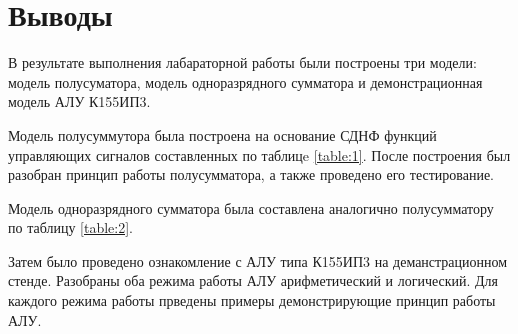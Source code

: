 \section*{Выводы}

В результате выполнения лабараторной работы были построены 
три модели: модель полусуматора, модель одноразрядного сумматора и
демонстрационная модель АЛУ К155ИП3. \par

Модель полусуммутора была построена на основание СДНФ функций управляющих сигналов 
составленных по таблицe \ref{table:1}. После построения был разобран принцип работы 
полусумматора, а также проведено его тестирование. \par

Модель одноразрядного сумматора была составлена аналогично полусумматору по таблицу \ref{table:2}.\par

Затем было проведено ознакомление с АЛУ типа К155ИП3 на деманстрационном стенде. Разобраны 
оба режима работы АЛУ арифметический и логический. Для каждого режима работы прведены примеры 
демонстрирующие принцип работы АЛУ. \par

